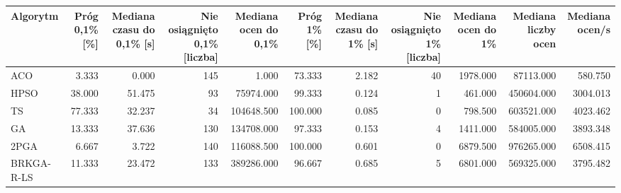 \begin{tabular}{lrrrrrrrrrr}
\toprule
Algorytm & Próg 0,1\% [\%] & Mediana czasu do 0,1\% [s] & Nie osiągnięto 0,1\% [liczba] & Mediana ocen do 0,1\% & Próg 1\% [\%] & Mediana czasu do 1\% [s] & Nie osiągnięto 1\% [liczba] & Mediana ocen do 1\% & Mediana liczby ocen & Mediana ocen/s \\
\midrule
ACO & 3.333 & 0.000 & 145 & 1.000 & 73.333 & 2.182 & 40 & 1978.000 & 87113.000 & 580.750 \\
HPSO & 38.000 & 51.475 & 93 & 75974.000 & 99.333 & 0.124 & 1 & 461.000 & 450604.000 & 3004.013 \\
TS & 77.333 & 32.237 & 34 & 104648.500 & 100.000 & 0.085 & 0 & 798.500 & 603521.000 & 4023.462 \\
GA & 13.333 & 37.636 & 130 & 134708.000 & 97.333 & 0.153 & 4 & 1411.000 & 584005.000 & 3893.348 \\
2PGA & 6.667 & 3.722 & 140 & 116088.500 & 100.000 & 0.601 & 0 & 6879.500 & 976265.000 & 6508.415 \\
BRKGA-R-LS & 11.333 & 23.472 & 133 & 389286.000 & 96.667 & 0.685 & 5 & 6801.000 & 569325.000 & 3795.482 \\
\bottomrule
\end{tabular}
